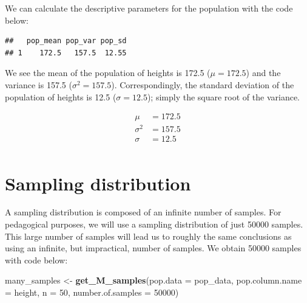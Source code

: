 \documentclass[
]{krantz}
\makeatletter
\newenvironment{Shaded}{\begin{snugshade}}{\end{snugshade}}
\newcommand{\DataTypeTok}[1]{\textcolor[rgb]{0.27,0.27,0.27}{#1}}
\newcommand{\DecValTok}[1]{\textcolor[rgb]{0.06,0.06,0.06}{#1}}
\newcommand{\KeywordTok}[1]{\textcolor[rgb]{0.27,0.27,0.27}{\textbf{#1}}}
\newcommand{\NormalTok}[1]{#1}
\newcommand{\OperatorTok}[1]{\textcolor[rgb]{0.43,0.43,0.43}{\textbf{#1}}}
\newcommand{\StringTok}[1]{\textcolor[rgb]{0.5,0.5,0.5}{#1}}
\newenvironment{kframe}{%
\medskip{}
\setlength{\fboxsep}{.8em}
 \def\at@end@of@kframe{}%
 \ifinner\ifhmode%
  \def\at@end@of@kframe{\end{minipage}}%
  \begin{minipage}{\columnwidth}%
 \fi\fi%
 \def\FrameCommand##1{\hskip\@totalleftmargin \hskip-\fboxsep
 \colorbox{shadecolor}{##1}\hskip-\fboxsep
     \hskip-\linewidth \hskip-\@totalleftmargin \hskip\columnwidth}%
 \MakeFramed {\advance\hsize-\width
   \@totalleftmargin\z@ \linewidth\hsize
   \@setminipage}}%
 {\par\unskip\endMakeFramed%
 \at@end@of@kframe}
\renewenvironment{Shaded}{\begin{kframe}}{\end{kframe}}
\makeatother
\begin{document}
We can calculate the descriptive parameters for the population with the code below:

\begin{Shaded}
\end{Shaded}

\begin{verbatim}
##   pop_mean pop_var pop_sd
## 1    172.5   157.5  12.55
\end{verbatim}

We see the mean of the population of heights is 172.5 (\(\mu = 172.5\)) and the variance is 157.5 (\(\sigma^2 = 157.5\)). Correspondingly, the standard deviation of the population of heights is 12.5 (\(\sigma = 12.5\)); simply the square root of the variance.

\[
\begin{aligned} 
\mu &= 172.5 \\
\sigma^2 &= 157.5 \\
\sigma &= 12.5 \\
\end{aligned} 
\]

\hypertarget{sampling-distribution}{%
\section{Sampling distribution}\label{sampling-distribution}}

A sampling distribution is composed of an infinite number of samples. For pedagogical purposes, we will use a sampling distribution of just 50000 samples. This large number of samples will lead us to roughly the same conclusions as using an infinite, but impractical, number of samples. We obtain 50000 samples with code below:

\begin{Shaded}
\begin{Highlighting}[]
\NormalTok{many_samples <-}\StringTok{ }\KeywordTok{get_M_samples}\NormalTok{(}\DataTypeTok{pop.data =}\NormalTok{ pop_data, }
                              \DataTypeTok{pop.column.name =}\NormalTok{ height,}
                              \DataTypeTok{n =} \DecValTok{50}\NormalTok{,}
                              \DataTypeTok{number.of.samples =} \DecValTok{50000}\NormalTok{)}
\end{Highlighting}
\end{Shaded}
\end{document}
